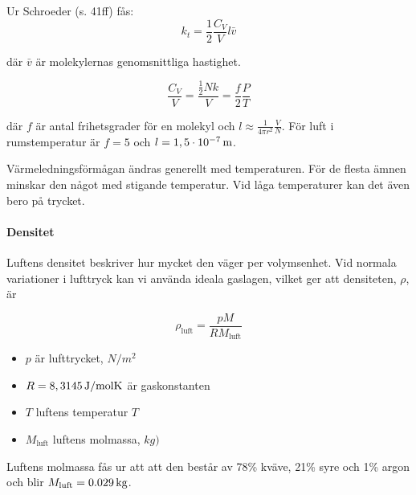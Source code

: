 Ur Schroeder (s. 41ff) fås:
\begin{equation}
\label{eq:natconst:schroeder1}
k_t=\frac{1}{2}\frac{C_V}{V} l \bar{v}
\end{equation}

där $\bar{v}$ är molekylernas genomsnittliga hastighet.

\begin{equation}
\label{eq:natconst:schroeder2}
\frac{C_V}{V}=\frac{\tfrac{1}{2}Nk}{V}=\frac{f}{2}\frac{P}{T}
\end{equation}

där $f$ är antal frihetsgrader för en molekyl och $l\approx\frac{1}{4\pi r^2}\frac{V}{N}$. För luft i rumstemperatur är $f=5$ och $l=\unit[1,5\cdot 10^{-7}]{m}$.

Värmeledningsförmågan ändras generellt med temperaturen. För de flesta ämnen minskar den något med stigande temperatur. Vid låga temperaturer kan det även bero på trycket. 



\paragraph{Densitet} %
\label{sec:densitet}


Luftens densitet beskriver hur mycket den väger per volymsenhet. Vid normala variationer i lufttryck kan vi använda ideala gaslagen, vilket ger att densiteten, $\rho$, är

\begin{equation}
\rho_\text{luft}=\frac{p M}{R M_\text{luft}}
\end{equation}

\begin{itemize}
   \item[] $p$ är lufttrycket, $\unit{N/m^2}$
   \item[] $R=\unit[8,3145]{J/ molK}$ är gaskonstanten
   \item[] $T$ luftens temperatur $\unit{T}$
   \item[] $M_\text{luft}$ luftens molmassa, $\unit{kg)}$
\end{itemize}

Luftens molmassa fås ur att att den består av 78\% kväve, 21\% syre och 1\% argon och blir $M_\text{luft}=\unit[0.029]{kg}$.


